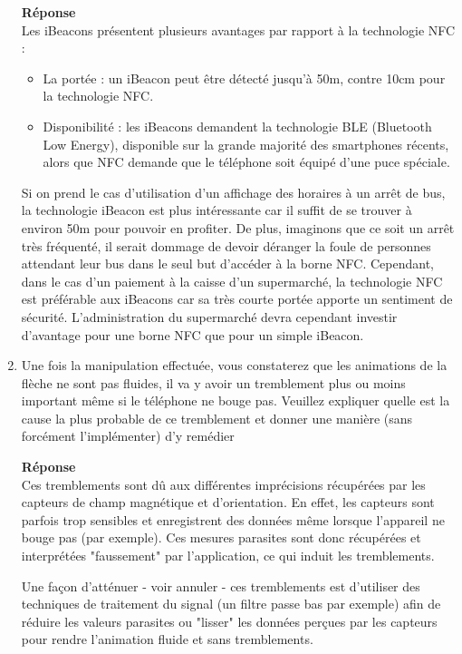 \documentclass[a4paper]{article}
\begin{document}
\begin{enumerate}
    \textbf{Réponse} \\
    Les iBeacons présentent plusieurs avantages par rapport à la technologie NFC :
    \begin{itemize}
    		\item La portée : un iBeacon peut être détecté jusqu'à 50m, contre 10cm pour la technologie NFC.
    		\item Disponibilité : les iBeacons demandent la technologie BLE (Bluetooth Low Energy), disponible sur la grande majorité des smartphones récents, alors que NFC demande que le téléphone soit équipé d'une puce spéciale.
    \end{itemize}
    
    	Si on prend le cas d'utilisation d'un affichage des horaires à un arrêt de bus, la technologie iBeacon est plus intéressante car il suffit de se trouver à environ 50m pour pouvoir en profiter. De plus, imaginons que ce soit un arrêt très fréquenté, il serait dommage de devoir déranger la foule de personnes attendant leur bus dans le seul but d'accéder à la borne NFC. Cependant, dans le cas d'un paiement à la caisse d'un supermarché, la technologie NFC est préférable aux iBeacons car sa très courte portée apporte un sentiment de sécurité. L'administration du supermarché devra cependant investir d'avantage pour une borne NFC que pour un simple iBeacon.
    
    \item Une fois la manipulation effectuée, vous constaterez que les animations de la flèche ne sont pas
    fluides, il va y avoir un tremblement plus ou moins important même si le téléphone ne bouge pas.
    Veuillez expliquer quelle est la cause la plus probable de ce tremblement et donner une manière (sans
    forcément l’implémenter) d’y remédier
    
    \textbf{Réponse} \\
    Ces tremblements sont dû aux différentes imprécisions récupérées par les capteurs de champ magnétique et d'orientation. En effet, les capteurs sont parfois trop sensibles et enregistrent des données même lorsque l'appareil ne bouge pas (par exemple). Ces mesures parasites sont donc récupérées et interprétées "faussement" par l'application, ce qui induit les tremblements.
    
    Une façon d'atténuer - voir annuler - ces tremblements est d'utiliser des techniques de traitement du signal (un filtre passe bas par exemple) afin de réduire les valeurs parasites ou "lisser" les données perçues par les capteurs pour rendre l'animation fluide et sans tremblements.
    
\end{enumerate}
\end{document}
